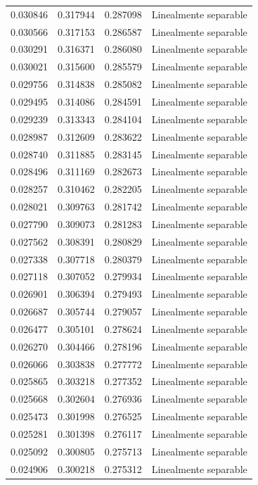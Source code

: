 \begin{tabular}{llll}
0.030846 & 0.317944 & 0.287098 & Linealmente separable \\
0.030566 & 0.317153 & 0.286587 & Linealmente separable \\
0.030291 & 0.316371 & 0.286080 & Linealmente separable \\
0.030021 & 0.315600 & 0.285579 & Linealmente separable \\
0.029756 & 0.314838 & 0.285082 & Linealmente separable \\
0.029495 & 0.314086 & 0.284591 & Linealmente separable \\
0.029239 & 0.313343 & 0.284104 & Linealmente separable \\
0.028987 & 0.312609 & 0.283622 & Linealmente separable \\
0.028740 & 0.311885 & 0.283145 & Linealmente separable \\
0.028496 & 0.311169 & 0.282673 & Linealmente separable \\
0.028257 & 0.310462 & 0.282205 & Linealmente separable \\
0.028021 & 0.309763 & 0.281742 & Linealmente separable \\
0.027790 & 0.309073 & 0.281283 & Linealmente separable \\
0.027562 & 0.308391 & 0.280829 & Linealmente separable \\
0.027338 & 0.307718 & 0.280379 & Linealmente separable \\
0.027118 & 0.307052 & 0.279934 & Linealmente separable \\
0.026901 & 0.306394 & 0.279493 & Linealmente separable \\
0.026687 & 0.305744 & 0.279057 & Linealmente separable \\
0.026477 & 0.305101 & 0.278624 & Linealmente separable \\
0.026270 & 0.304466 & 0.278196 & Linealmente separable \\
0.026066 & 0.303838 & 0.277772 & Linealmente separable \\
0.025865 & 0.303218 & 0.277352 & Linealmente separable \\
0.025668 & 0.302604 & 0.276936 & Linealmente separable \\
0.025473 & 0.301998 & 0.276525 & Linealmente separable \\
0.025281 & 0.301398 & 0.276117 & Linealmente separable \\
0.025092 & 0.300805 & 0.275713 & Linealmente separable \\
0.024906 & 0.300218 & 0.275312 & Linealmente separable \\

\end{tabular}
